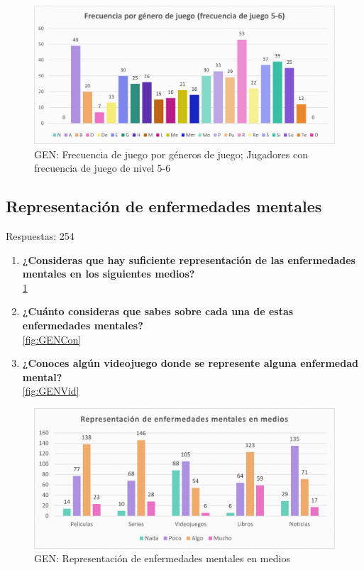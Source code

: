 \documentclass[12pt, a4paper,twoside,titlepage]{book}
\begin{document}
\begin{figure}
    \centering
    \includegraphics[width=1\linewidth]{ANEXO Gen/8AnexGENFrecgen56}
    \caption{GEN: Frecuencia de juego por géneros de juego; Jugadores con frecuencia de juego de nivel 5-6}
\end{figure}



\subsection{Representación de enfermedades mentales}
Respuestas: 254
\begin{enumerate}[label=\textbf{\arabic*}.]
     \item \textbf{¿Consideras que hay suficiente representación de las enfermedades mentales en los siguientes medios?} \\
     \ref{fig:GENMedios}
     \item \textbf{¿Cuánto consideras que sabes sobre cada una de estas enfermedades mentales? }\\
     \ref{fig:GENCon}
     \item \textbf{¿Conoces algún videojuego donde se represente alguna enfermedad mental? }\\
     \ref{fig:GENVid}
\end{enumerate}

\begin{figure}
    \centering
    \includegraphics[width=1\linewidth]{ANEXO Gen/9AnexGENMedios}
    \caption{GEN: Representación de enfermedades mentales en medios}
    \label{fig:GENMedios}
\end{figure}
\end{document}
